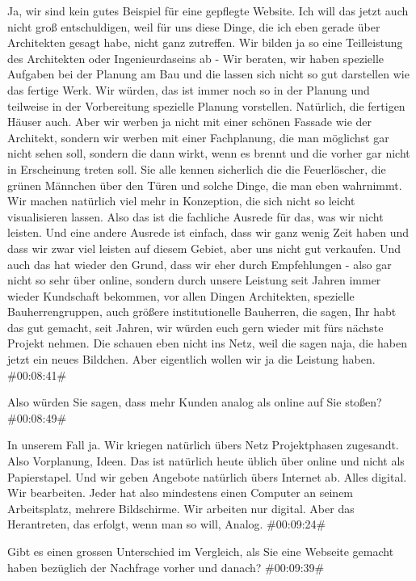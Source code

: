 \documentclass[a4paper, 12pt]{scrartcl}
\begin{document}
\begin{description}
\Andre Ja, wir sind kein gutes Beispiel für eine gepflegte Website. Ich will das jetzt auch nicht groß entschuldigen, weil für uns diese Dinge, die ich eben gerade über Architekten gesagt habe, nicht ganz zutreffen. Wir bilden ja so eine Teilleistung des Architekten oder Ingenieurdaseins ab - Wir beraten, wir haben spezielle Aufgaben bei der Planung am Bau und die lassen sich nicht so gut darstellen wie das fertige Werk. Wir würden, das ist immer noch so in der Planung und teilweise in der Vorbereitung spezielle Planung vorstellen. Natürlich, die fertigen Häuser auch. Aber wir werben ja nicht mit einer schönen Fassade wie der Architekt, sondern wir werben mit einer Fachplanung, die man möglichst gar nicht sehen soll, sondern die dann wirkt, wenn es brennt und die vorher gar nicht in Erscheinung treten soll. Sie alle kennen sicherlich die die Feuerlöscher, die grünen Männchen über den Türen und solche Dinge, die man eben wahrnimmt. Wir machen natürlich viel mehr in Konzeption, die sich nicht so leicht visualisieren lassen. Also das ist die fachliche Ausrede für das, was wir nicht leisten. Und eine andere Ausrede ist einfach, dass wir ganz wenig Zeit haben und dass wir zwar viel leisten auf diesem Gebiet, aber uns nicht gut verkaufen. Und auch das hat wieder den Grund, dass wir eher durch Empfehlungen - also gar nicht so sehr über online, sondern durch unsere Leistung seit Jahren immer wieder Kundschaft bekommen, vor allen Dingen Architekten, spezielle Bauherrengruppen, auch größere institutionelle Bauherren, die sagen, Ihr habt das gut gemacht, seit Jahren, wir würden euch gern wieder mit fürs nächste Projekt nehmen. Die schauen eben nicht ins Netz, weil die sagen naja, die haben jetzt ein neues Bildchen. Aber eigentlich wollen wir ja die Leistung haben. \#00:08:41\#

\Fabian Also würden Sie sagen, dass mehr Kunden analog als online auf Sie stoßen? \#00:08:49\#

\Andre In unserem Fall ja. Wir kriegen natürlich übers Netz Projektphasen zugesandt. Also Vorplanung, Ideen. Das ist natürlich heute üblich über online und nicht als Papierstapel. Und wir geben Angebote natürlich übers Internet ab. Alles digital. Wir bearbeiten. Jeder hat also mindestens einen Computer an seinem Arbeitsplatz, mehrere Bildschirme. Wir arbeiten nur digital. Aber das Herantreten, das erfolgt, wenn man so will, Analog. \#00:09:24\#

\Toni Gibt es einen grossen Unterschied im Vergleich, als Sie eine Webseite gemacht haben bezüglich der Nachfrage vorher und danach? \#00:09:39\#


\end{description}
\end{document}
